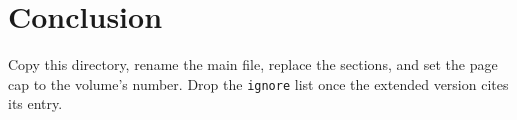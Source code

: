 \section{Conclusion}

Copy this directory, rename the main file, replace the sections, and set the
page cap to the volume's number. Drop the \texttt{ignore} list once the
extended version cites its entry.
